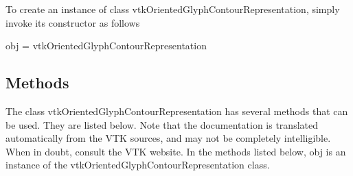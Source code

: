 To create an instance of class vtk\-Oriented\-Glyph\-Contour\-Representation, simply invoke its constructor as follows \begin{DoxyVerb}  obj = vtkOrientedGlyphContourRepresentation
\end{DoxyVerb}
 \hypertarget{vtkwidgets_vtkxyplotwidget_Methods}{}\subsection{Methods}\label{vtkwidgets_vtkxyplotwidget_Methods}
The class vtk\-Oriented\-Glyph\-Contour\-Representation has several methods that can be used. They are listed below. Note that the documentation is translated automatically from the V\-T\-K sources, and may not be completely intelligible. When in doubt, consult the V\-T\-K website. In the methods listed below, {\ttfamily obj} is an instance of the vtk\-Oriented\-Glyph\-Contour\-Representation class. 
